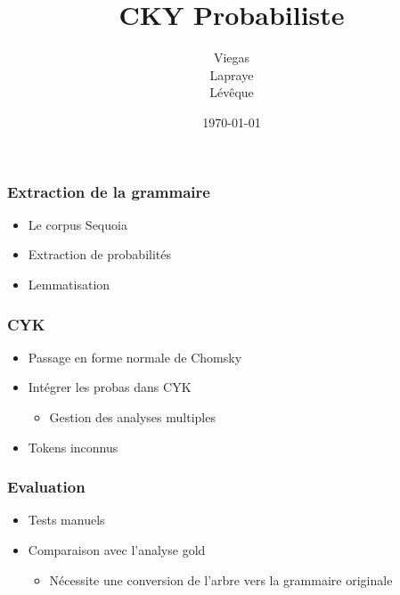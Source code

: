 \documentclass{beamer}
\begin{document}
\title{CKY Probabiliste}  %
\author{Viegas\\Lapraye\\Lévêque}

\date{\today}


\begin{frame}
 \maketitle
\end{frame}




\begin{frame}
\frametitle{Extraction de la grammaire}

\begin{itemize}
 \item<1-3> Le corpus Sequoia
 \item<2-3> Extraction de probabilités
 \item<3-3> Lemmatisation
\end{itemize}

 
\end{frame}

\begin{frame}
 \frametitle{CYK}
 \begin{itemize}
  \item<1-3>{Passage en forme normale de Chomsky}
  \item<2-3>{Intégrer les probas dans CYK}
  \begin{itemize}
   \item<2-3>{Gestion des analyses multiples}
  \end{itemize}
  \item<3>{Tokens inconnus}
 
 \end{itemize}

 
\end{frame}

\begin{frame}
\frametitle{Evaluation}
 \begin{itemize}
  
  \item<1-3>{Tests manuels}
  
  \item{Comparaison avec l'analyse gold}
  \begin{itemize}
   \item{Nécessite une conversion de l'arbre vers la grammaire originale}
  \end{itemize}

 \end{itemize}

\end{frame}
\end{document}
